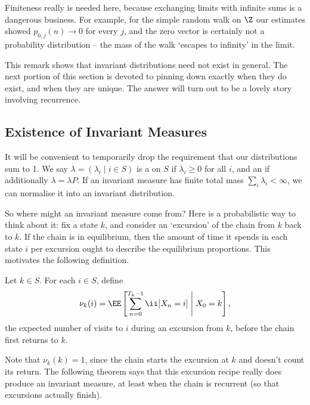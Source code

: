 \documentclass[a4paper]{scrartcl}
\begin{document}
\begin{remark}
	Finiteness really is needed here, because exchanging limits with infinite sums is a dangerous business. For example, for the simple random walk on $\Z$ our estimates showed $p_{0, j}(n) \rightarrow 0$ for every $j$, and the zero vector is certainly not a probability distribution -- the mass of the walk `escapes to infinity' in the limit.
\end{remark}

This remark shows that invariant distributions need not exist in general. The next portion of this section is devoted to pinning down exactly when they do exist, and when they are unique. The answer will turn out to be a lovely story involving recurrence.

\subsection{Existence of Invariant Measures}

It will be convenient to temporarily drop the requirement that our distributions sum to 1. We say $\lambda = (\lambda_i \mid i \in S)$ is a  on $S$ if $\lambda_i \geq 0$ for all $i$, and an  if additionally $\lambda = \lambda P$. If an invariant measure has finite total mass $\sum_i \lambda_i < \infty$, we can normalise it into an invariant distribution.

So where might an invariant measure come from? Here is a probabilistic way to think about it: fix a state $k$, and consider an `excursion' of the chain from $k$ back to $k$. If the chain is in equilibrium, then the amount of time it spends in each state $i$ per excursion ought to describe the equilibrium proportions. This motivates the following definition.

\begin{definition}
	Let $k \in S$. For each $i \in S$, define
	$$
	\nu_k(i) = \EE\left[\sum_{n = 0}^{T_k - 1} \ii[X_n = i] \;\middle|\; X_0 = k\right],
	$$
	the expected number of visits to $i$ during an excursion from $k$, before the chain first returns to $k$.
\end{definition}

Note that $\nu_k(k) = 1$, since the chain starts the excursion at $k$ and doesn't count its return. The following theorem says that this excursion recipe really does produce an invariant measure, at least when the chain is recurrent (so that excursions actually finish).
\end{document}
